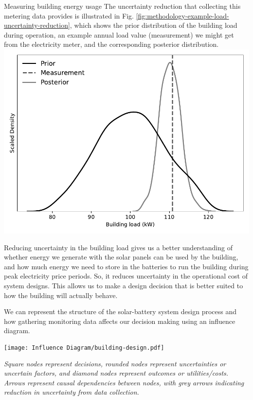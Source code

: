 \begin{ebox}[label=ebox:bayes]{Measuring building energy usage}
    The uncertainty reduction that collecting this metering data provides is illustrated in Fig. \ref{fig:methodology-example-load-uncertainty-reduction}, which shows the prior distribution of the building load during operation, an example annual load value (measurement) we might get from the electricity meter, and the corresponding posterior distribution.\\

    {
        \centering
        \includegraphics[width=0.66\linewidth]{Methodology/Figs/msr_uncertainty_reduction.pdf}
        \vspace*{-0.25cm}
        \label{fig:methodology-example-load-uncertainty-reduction}
    }
    \smallskip

    Reducing uncertainty in the building load gives us a better understanding of whether energy we generate with the solar panels can be used by the building, and how much energy we need to store in the batteries to run the building during peak electricity price periods. So, it reduces uncertainty in the operational cost of system designs. This allows us to make a design decision that is better suited to how the building will actually behave.

    We can represent the structure of the solar-battery system design process and how gathering monitoring data affects our decision making using an influence diagram.\\

    {
        \centering
        \texttt{[image: Influence Diagram/building-design.pdf]}
        \vspace*{0cm}
        \label{fig:methodology-example-influence-diagram}
        \begin{singlespace}
            \raggedright
            \footnotesize{\it Square nodes represent decisions, rounded nodes represent uncertainties or uncertain factors, and diamond nodes represent outcomes or utilities/costs. Arrows represent causal dependencies between nodes, with grey arrows indicating reduction in uncertainty from data collection.}
        \end{singlespace}
    }
    \hfill\


\end{ebox}
